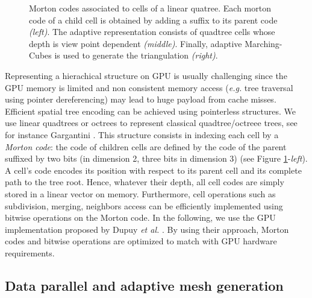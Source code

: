 \documentclass{llncs}
\begin{document}
\begin{figure}[!htbp]
  \begin{center}
  \end{center}
\caption{Morton codes associated to cells of a linear quatree. Each
   morton code of a child cell is obtained by adding a suffix to its
  parent code \emph{(left)}. The adaptive representation consists of
  quadtree cells whose depth is view point dependent
  \emph{(middle)}. Finally, adaptive Marching-Cubes is used to
  generate the triangulation \emph{(right)}.}
\label{fig_quadtree_partitionning}
\end{figure}

Representing a hierachical structure on GPU is usually challenging
since the GPU memory is limited and non consistent 
memory access (\emph{e.g.} tree traversal using pointer dereferencing)
may lead to huge payload from cache misses.  Efficient spatial tree
encoding can be achieved using pointerless structures. We use
linear quadtrees or octrees to represent classical quadtree/octreee
trees, see for instance Gargantini
\cite{gargantini1982effective}. This structure consists in indexing
each cell by a \emph{Morton code}: the code of children cells are
defined by the code of the parent suffixed by two bits (in dimension
2, three bits in dimension 3) (see Figure
\ref{fig_quadtree_partitionning}-\emph{left}). A cell's code encodes
 its position with respect to its parent cell and its
complete path to the tree root. Hence, whatever their depth, all cell
codes are simply stored in a linear vector on memory. Furthermore,
cell operations such as subdivision, merging, neighbors access can be
efficiently implemented using bitwise operations on the Morton code.
In the following, we use the GPU implementation proposed by Dupuy
\textit{et al.}  \cite{dupuy2014quadtrees}. By using their approach, Morton
codes and bitwise operations are optimized to match with GPU hardware
requirements.

\subsection{Data parallel and adaptive mesh generation}
\end{document}
